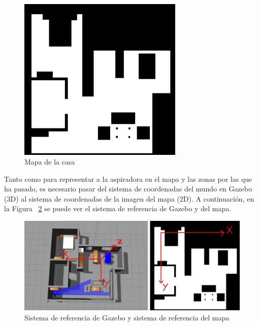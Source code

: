 \begin{figure}[H]
  \begin{center}
    \includegraphics[width=0.7\textwidth]{figures/Vacuum/mapa.png}
		\caption{Mapa de la casa}
		\label{fig.mapa}
		\end{center}
\end{figure}


Tanto como para representar a la aspiradora en el mapa y las zonas por las que ha pasado,  es necesario pasar del sistema de coordenadas del mundo en Gazebo (3D) al sistema de coordenadas de la imagen del mapa (2D). A continuación, en la Figura ~\ref{fig.sistemaRef} se puede ver el sistema de referencia de Gazebo y del mapa.

\begin{figure}[H]
  \begin{center}
    \includegraphics[width=1.0\textwidth]{figures/Vacuum/sistemaRef.jpg}
		\caption{Sistema de referencia de Gazebo y sistema de referencia del mapa}
		\label{fig.sistemaRef}
		\end{center}
\end{figure}


